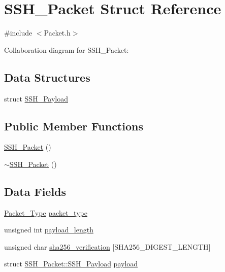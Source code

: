 \hypertarget{structSSH__Packet}{}\section{S\+S\+H\+\_\+\+Packet Struct Reference}
\label{structSSH__Packet}


{\ttfamily \#include $<$Packet.\+h$>$}



Collaboration diagram for S\+S\+H\+\_\+\+Packet\+:
\subsection*{Data Structures}
\begin{DoxyCompactItemize}
\item 
struct \hyperlink{structSSH__Packet_1_1SSH__Payload}{S\+S\+H\+\_\+\+Payload}
\end{DoxyCompactItemize}
\subsection*{Public Member Functions}
\begin{DoxyCompactItemize}
\item 
\hyperlink{structSSH__Packet_a0b717b3f7f3f724c54dddba9578145f3}{S\+S\+H\+\_\+\+Packet} ()
\item 
\hyperlink{structSSH__Packet_a476661ce993ff29f35948ad8760f37d5}{$\sim$\+S\+S\+H\+\_\+\+Packet} ()
\end{DoxyCompactItemize}
\subsection*{Data Fields}
\begin{DoxyCompactItemize}
\item 
\hyperlink{Packet_8h_a307e533851c91d484ac30d8471095890}{Packet\+\_\+\+Type} \hyperlink{structSSH__Packet_a96bc51da8a7f7c0ce64e23b3991e335b}{packet\+\_\+type}
\item 
unsigned int \hyperlink{structSSH__Packet_a53e4ab1ac5efa60989390c1966a7d3fb}{payload\+\_\+length}
\item 
unsigned char \hyperlink{structSSH__Packet_a70c8dd74e6122753c751e92b5b697caf}{sha256\+\_\+verification} \mbox{[}S\+H\+A256\+\_\+\+D\+I\+G\+E\+S\+T\+\_\+\+L\+E\+N\+G\+TH\mbox{]}
\item 
struct \hyperlink{structSSH__Packet_1_1SSH__Payload}{S\+S\+H\+\_\+\+Packet\+::\+S\+S\+H\+\_\+\+Payload} \hyperlink{structSSH__Packet_a9a14fdf456e41d1e7b8ac7e98e2de83b}{payload}
\end{DoxyCompactItemize}


